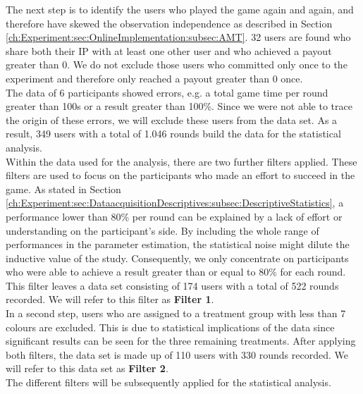 The next step is to identify the users who played the game again and again, and therefore have skewed the observation independence as described in Section \ref{ch:Experiment:sec:OnlineImplementation:subsec:AMT}. 32 users are found who share both their IP with at least one other user and who achieved a payout greater than 0. We do not exclude those users who committed only once to the experiment and therefore only reached a payout greater than 0 once. \\
The data of 6 participants showed errors, e.g. a total game time per round greater than 100s or a result greater than 100\%. Since we were not able to trace the origin of these errors, we will exclude these users from the data set.
As a result, 349 users with a total of 1.046 rounds build the data for the statistical analysis.\\
Within the data used for the analysis, there are two further filters applied.
These filters are used to focus on the participants who made an effort to succeed in the game. As stated in Section \ref{ch:Experiment:sec:DataacquisitionDescriptives:subsec:DescriptiveStatistics}, a performance lower than 80\% per round can be explained by a lack of effort or understanding on the participant's side. By including the whole range of performances in the parameter estimation, the statistical noise might dilute the inductive value of the study. Consequently, we only concentrate on participants who were able to achieve a result greater than or equal to 80\% for each round. This filter leaves a data set consisting of 174 users with a total of 522 rounds recorded. We will refer to this filter as \textbf{Filter 1}.\\
In a second step, users who are assigned to a treatment group with less than 7 colours are excluded. This is due to statistical implications of the data since significant results can be seen for the three remaining treatments. After applying both filters, the data set is made up of 110 users with 330 rounds recorded. We will refer to this data set as \textbf{Filter 2}.\\
The different filters will be subsequently applied for the statistical analysis.
%
%
%
%
%
%

